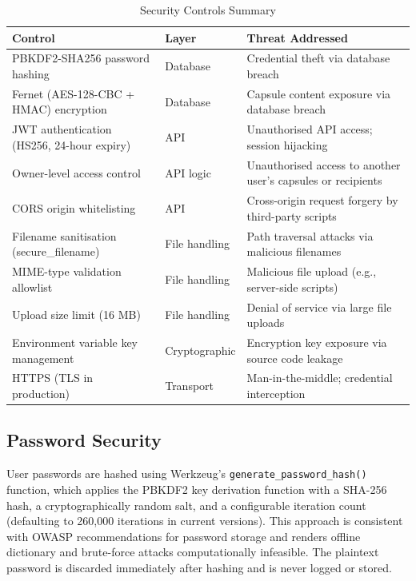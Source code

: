 \documentclass[12pt, a4paper]{article}
\begin{document}
\begin{table}[H]
  \centering
  \caption{Security Controls Summary}
  \label{tab:security_controls}
  \begin{tabularx}{\textwidth}{|p{3.5cm}|p{2.5cm}|X|}
  \hline
  \textbf{Control} & \textbf{Layer} & \textbf{Threat Addressed} \\
  \hline
  PBKDF2-SHA256 password hashing & Database & Credential theft via database breach \\
  \hline
  Fernet (AES-128-CBC + HMAC) encryption & Database & Capsule content exposure via database breach \\
  \hline
  JWT authentication (HS256, 24-hour expiry) & API & Unauthorised API access; session hijacking \\
  \hline
  Owner-level access control & API logic & Unauthorised access to another user's capsules or recipients \\
  \hline
  CORS origin whitelisting & API & Cross-origin request forgery by third-party scripts \\
  \hline
  Filename sanitisation (secure\_filename) & File handling & Path traversal attacks via malicious filenames \\
  \hline
  MIME-type validation allowlist & File handling & Malicious file upload (e.g., server-side scripts) \\
  \hline
  Upload size limit (16 MB) & File handling & Denial of service via large file uploads \\
  \hline
  Environment variable key management & Cryptographic & Encryption key exposure via source code leakage \\
  \hline
  HTTPS (TLS in production) & Transport & Man-in-the-middle; credential interception \\
  \hline
  \end{tabularx}
\end{table}

\subsection{Password Security}

User passwords are hashed using Werkzeug's \texttt{generate\_password\_hash()} function, which applies the PBKDF2 key derivation function with a SHA-256 hash, a cryptographically random salt, and a configurable iteration count (defaulting to 260,000 iterations in current versions). This approach is consistent with OWASP recommendations for password storage \cite{owasp2023} and renders offline dictionary and brute-force attacks computationally infeasible. The plaintext password is discarded immediately after hashing and is never logged or stored.
\end{document}
